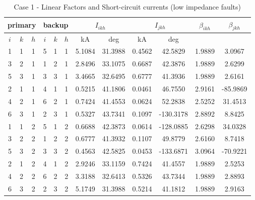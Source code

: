 \documentclass[letterpaper, 10 pt, conference]{IEEEtran}
\begin{document}
  \begin{table}[h!]\centering\label{kappas}
\begin{tabular}{ccc|ccc|cc|cc|c|c}\hline
 \multicolumn{3}{c|}{primary}  &  \multicolumn{3}{|c|}{backup}  &  \multicolumn{2}{|c|}{$I_{ikh}$}
  &  \multicolumn{2}{|c|}{$I_{jkh}$} & $\beta_{ikh} $  &  $\beta_{jkh}$\\\hline
$i$ &   $k$&    $h$     &  $i$ &   $k$&    $h$     & kA & deg & kA & deg & & \\\hline
1	&	1	&	1	&	5	&	1	&	1	&	5.1084	&	31.3988	&	0.4562	&	42.5829	&	1.9889	&	3.0967	\\	
3	&	2	&	1	&	1	&	2	&	1	&	2.8496	&	33.1075	&	0.6687	&	42.3876	&	1.9889	&	2.6299	\\	
5	&	3	&	1	&	3	&	3	&	1	&	3.4665	&	32.6495	&	0.6777	&	41.3936	&	1.9889	&	2.6161	\\	
2	&	1	&	1	&	4	&	1	&	1	&	0.5215	&	41.1806	&	0.0461	&	46.7550	&	2.9161	&	-85.9869	\\	
4	&	2	&	1	&	6	&	2	&	1	&	0.7424	&	41.4553	&	0.0624	&	52.2838	&	2.5252	&	31.4513	\\	
6	&	3	&	1	&	2	&	3	&	1	&	0.5327	&	43.7341	&	0.1097	&	-130.3178	&	2.8892	&	8.8425	\\	
1	&	1	&	2	&	5	&	1	&	2	&	0.6688	&	42.3873	&	0.0614	&	-128.0885	&	2.6298	&	34.0328	\\	
3	&	2	&	2	&	1	&	2	&	2	&	0.6777	&	41.3932	&	0.1107	&	49.8779	&	2.6160	&	8.7418	\\	
5	&	3	&	2	&	3	&	3	&	2	&	0.4563	&	42.5825	&	0.0453	&	-133.6871	&	3.0964	&	-70.9221	\\	
2	&	1	&	2	&	4	&	1	&	2	&	2.9246	&	33.1159	&	0.7424	&	41.4557	&	1.9889	&	2.5253	\\	
4	&	2	&	2	&	6	&	2	&	2	&	3.3188	&	32.6413	&	0.5326	&	43.7344	&	1.9889	&	2.8893	\\	
6	&	3	&	2	&	2	&	3	&	2	&	5.1749	&	31.3988	&	0.5214	&	41.1812	&	1.9889	&	2.9163	\\	

\hline
  \end{tabular}
  \caption{Case 1 - Linear Factors and Short-circuit currents (low impedance faults)}
\end{table}
\end{document}
